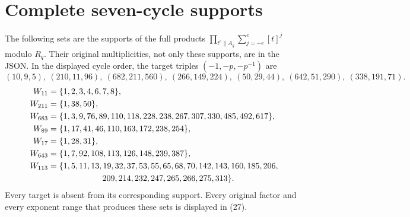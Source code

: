 \appendix
\section{Complete seven-cycle supports}\label{app:cycle}
The following sets are the supports of the full products
$\prod_{t^e\parallel A_q}\sum_{j=-e}^e[t]^j$ modulo $R_q$.
Their original multiplicities, not only these supports, are in the JSON.
In the displayed cycle order, the target triples $(-1,-p,-p^{-1})$ are
\[
 (10,9,5),\ (210,11,96),\ (682,211,560),\ (266,149,224),
 \ (50,29,44),\ (642,51,290),\ (338,191,71).
\]
\begin{align*}
W_{11}&=\{1,2,3,4,6,7,8\},\\
W_{211}&=\{1,38,50\},\\
W_{683}&=\{1,3,9,76,89,110,118,228,238,267,307,330,485,492,617\},\\
W_{89}&=\{1,17,41,46,110,163,172,238,254\},\\
W_{17}&=\{1,28,31\},\\
W_{643}&=\{1,7,92,108,113,126,148,239,387\},\\
W_{113}&=\{1,5,11,13,19,32,37,53,55,65,68,70,142,143,160,185,206,\\
&\hspace{23mm}209,214,232,247,265,266,275,313\}.
\end{align*}
Every target is absent from its corresponding support. Every original factor
and every exponent range that produces these sets is displayed in (27).
